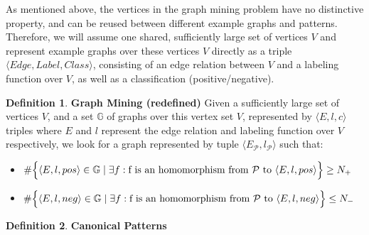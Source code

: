 \documentclass{article}
\theoremstyle{definition}
\newtheorem{definition}{Definition}[section]
\newcommand{\triple}[1]{\ensuremath{\langle #1 \rangle}}
\newcommand{\pair}[1]{\ensuremath{\left(#1\right)}}
\newcommand{\graph}[1]{\ensuremath{\mathcal{#1}}}
\newcommand{\graphset}[1]{\ensuremath{\mathbb{#1}}}
\begin{document}

As mentioned above, the vertices in the graph mining problem have no distinctive property, and can be reused between different example graphs and patterns.
Therefore, we will assume one shared, sufficiently large set of vertices $V$ and represent example graphs over these vertices $V$ directly as a triple $\triple{Edge, Label, Class}$, consisting of an edge relation between $V$ and a labeling function over $V$, as well as a classification (positive/negative).

\begin{definition} \textbf{Graph Mining (redefined)}
\label{def:gm2}
Given a sufficiently large set of vertices $V$, and a set $\graphset{G}$ of graphs over this vertex set $V$, represented by $\triple{E, l, c}$ triples
where $E$ and $l$ represent the edge relation and labeling function over $V$ respectively,
we look for a 
graph represented by tuple $\triple{E_{\graph{P}}, l_{\graph{P}}}$ such that:

\begin{itemize}
\item $\#\Big\lbrace \triple{E,l,pos} \in \graphset{G} \; | \; \exists f : \text{f is an homomorphism from \graph{P} to \triple{E,l,pos}} \Big\rbrace \geq N_{+}$

\item $\#\Big\lbrace \triple{E,l,neg} \in \graphset{G} \; | \; \exists f : \text{f is an homomorphism from \graph{P} to \triple{E,l,neg}} \Big\rbrace \leq N_{-}$
\end{itemize}
\end{definition}

\begin{definition} \textbf{Canonical Patterns}

\end{definition}
\end{document}
